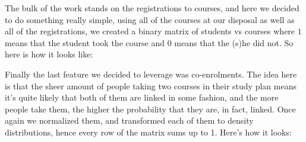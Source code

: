\documentclass{article}
\begin{document}
        The bulk of the work stands on the registrations to courses, and here we decided to do something really simple, using all of the courses at our disposal as well as all of the registrations, we created a binary matrix of students vs courses where $1$ means that the student took the course and $0$ means that the (s)he did not. So here is how it looks like:
\begin{flushleft}
\end{flushleft}
        Finally the last feature we decided to leverage was co-enrolments. The idea here is that the sheer amount of people taking two courses in their study plan means it's quite likely that both of them are linked in some fashion, and the more people take them, the higher the probability that they are, in fact, linked. Once again we normalized them, and transformed each of them to density distributions, hence every row of the matrix sums up to 1. Here's how it looks:
\end{document}
